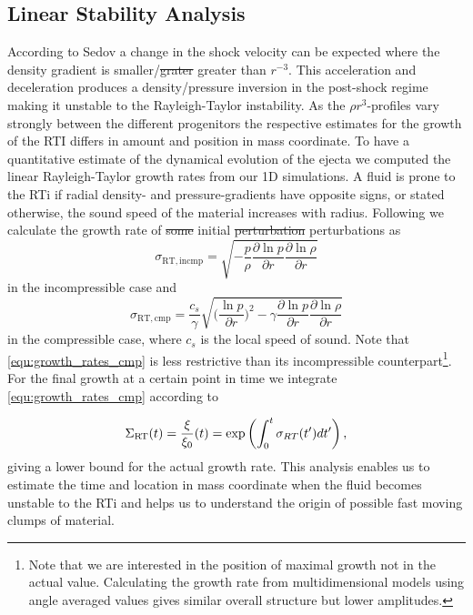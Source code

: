 \documentclass[fleqn,usenatbib]{mnras}
\newcommand{\NY}[2]{{\color{blue}\sout{#1}#2}}
\begin{document}
\subsection{Linear Stability Analysis}
\label{subsubsec:Linear Stability Analysis}
According to Sedov \cite{Sedov1961} a change in the shock velocity can be expected where the density gradient is smaller/\NY{grater}{ greater} than $r^{-3}$. This acceleration and deceleration produces a density/pressure inversion in the post-shock regime making it unstable to the Rayleigh-Taylor instability. As the $\rho r^3 $-profiles vary strongly between the different progenitors the respective estimates for the growth of the RTI differs in amount and position in mass coordinate.
To have a quantitative estimate of the dynamical evolution of the ejecta we computed the linear Rayleigh-Taylor growth rates from our 1D simulations. A fluid is prone to the RTi if radial density- and pressure-gradients have opposite signs, or stated otherwise, the sound speed of the material increases with radius. Following \cite{Mueller1991} we calculate the growth rate of \NY{some}{} initial \NY{perturbation}{ perturbations} as
\begin{equation}
  \label{equ:growth_rates_incmp}
  \sigma_{\mathrm{RT,incmp}} = \sqrt{- \frac{p}{\rho}\frac{\partial \ln p}{\partial r}\frac{\partial \ln \rho}{\partial r}}
\end{equation}
in the incompressible case and
\begin{equation}
  \sigma_{\mathrm{RT, cmp}} = \frac{c_{s}}{\gamma}\sqrt{\Big(\frac{\ln p}{\partial r}\Big)^ 2 - \gamma \frac{\partial \ln p}{\partial r}\frac{\partial \ln \rho}{\partial r}}\label{equ:growth_rates_cmp}
\end{equation}
in the compressible case, where $c_s$ is the local speed of sound. Note that \autoref{equ:growth_rates_cmp} is less restrictive than its incompressible counterpart\footnote{Note that we are interested in the position of maximal growth not in the actual value. Calculating the growth rate from multidimensional models using angle averaged values gives similar overall structure but lower amplitudes.}. 
For the final growth at a certain point in time we integrate \autoref{equ:growth_rates_cmp} according to

\begin{equation}
  \Sigma_{\rm RT}(t) = \frac{\xi}{\xi_0}(t) = \exp \left(\int_0^t \sigma_{RT} (t') dt' \right),\label{equ:growth_rates_int}
\end{equation}
giving a lower bound for the actual growth rate. This analysis enables us to estimate the time and location in mass coordinate when the fluid becomes unstable to the RTi and helps us to understand the origin of possible fast moving clumps of material.
\end{document}
